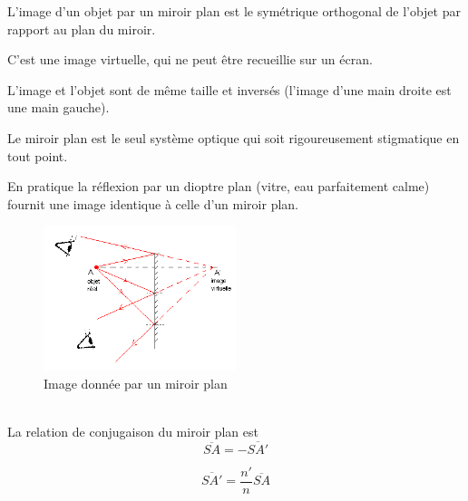 \documentclass[a4paper,11pt]{article}
\begin{document}
\begin{form}
L'image d'un objet par un miroir plan est le symétrique orthogonal de l'objet par rapport au plan du miroir.

C'est une image virtuelle, qui ne peut être recueillie sur un écran.

L'image et l'objet sont de même taille et inversés (l'image d'une main droite est une main gauche).

Le miroir plan est le seul système optique qui soit rigoureusement stigmatique en tout point.

En pratique la réflexion par un dioptre plan (vitre, eau parfaitement calme) fournit une image identique à celle d'un miroir plan.
\begin{figure}[h]
  \caption{Image donnée par un miroir plan}
  \centering
  \includegraphics[width=0.5\textwidth]{Miroir_plan1}
\end{figure}
  \\ La relation de conjugaison du miroir plan est $$\overline{SA}=-\overline{SA'}$$
\end{form}
\begin{form}
$$\overline{SA'}=\frac{n'}{n}\overline{SA}$$
\end{form}
\end{document}
